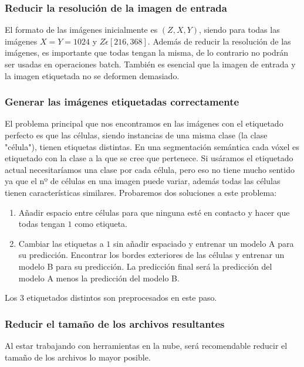 \subsubsection{Reducir la resolución de la imagen de entrada}

El formato de las imágenes inicialmente es $ (Z,X,Y) $, siendo para todas las imágenes $ X = Y = 1024 $ y $ Z\epsilon[216,368] $. Además de reducir la resolución de las imágenes, es importante que todas tengan la misma, de lo contrario no podrán ser usadas en operaciones batch. También es esencial que la imagen de entrada y la imagen etiquetada no se deformen demasiado.

\subsubsection{Generar las imágenes etiquetadas correctamente}

El problema principal que nos encontramos en las imágenes con el etiquetado perfecto es que las células, siendo instancias de una misma clase (la clase "célula"), tienen etiquetas distintas. En una segmentación semántica cada vóxel es etiquetado con la clase a la que se cree que pertenece. Si usáramos el etiquetado actual necesitaríamos una clase por cada célula, pero eso no tiene mucho sentido ya que el nº de células en una imagen puede variar, además todas las células tienen características similares. Probaremos dos soluciones a este problema:

\begin{enumerate}
\item Añadir espacio entre células para que ninguna esté en contacto y hacer que todas tengan $ 1 $ como etiqueta.
\item Cambiar las etiquetas a $ 1 $ sin añadir espaciado y entrenar un modelo A para su predicción. Encontrar los bordes exteriores de las células y entrenar un modelo B para su predicción. La predicción final será la predicción del modelo A menos la predicción del modelo B.
\end{enumerate}

Los 3 etiquetados distintos son preprocesados en este paso.

\subsubsection{Reducir el tamaño de los archivos resultantes}

Al estar trabajando con herramientas en la nube, será recomendable reducir el tamaño de los archivos lo mayor posible.

